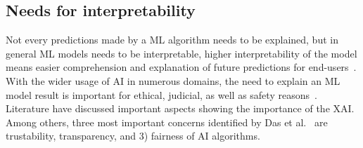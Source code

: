 \subsection{Needs for interpretability}
Not every predictions made by a ML algorithm needs to be explained, but in general ML models needs to be interpretable, higher interpretability of the model means easier comprehension and explanation of future predictions for end-users~\cite{stiglic2020interpretability}. With the wider usage of AI in numerous domains, the need to
explain an ML model result is important for ethical, judicial,
as well as safety reasons~\cite{das2020opportunities}. Literature have discussed important aspects showing the importance of the XAI. Among others, three most important concerns identified by Das et al.~\cite{das2020opportunities} are trustability, transparency, and 3) fairness of AI algorithms. 

